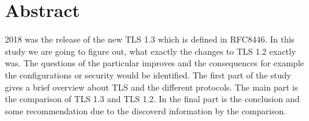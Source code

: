 \chapter*{Abstract}
\label{chap:abstract}

2018 was the release of the new TLS 1.3 which is defined in RFC8446. In this study we are going to figure out, what exactly the changes to TLS 1.2 exactly was. The questions of the particular improves and the consequences for example the configurations or security would be identified.
The first part of the study gives a brief overview about TLS and the different protocols. The main part is the comparison of TLS 1.3 and TLS 1.2.
In the final part is the conclusion and some recommendation due to the discoverd information by the comparison.


